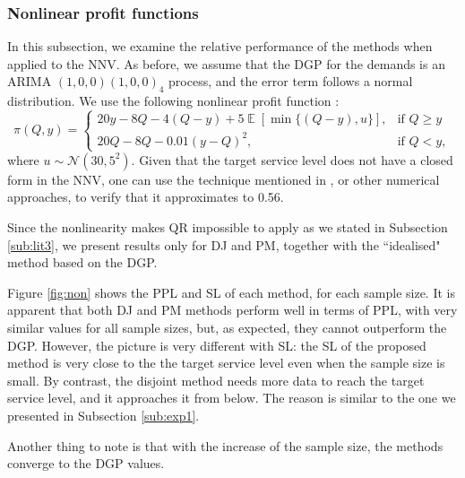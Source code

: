\documentclass{article}
\DeclareMathOperator{\E}{\mathbb{E}}
\begin{document}
\subsubsection{Nonlinear profit functions} \label{sub:exp2}

In this subsection, we examine the relative performance of the methods when applied to the NNV. As before, we assume that the DGP for the demands is an ARIMA $(1,0,0)(1,0,0)_4$ process, and the error term follows a normal distribution. We use the following nonlinear profit function \cite{KK18}:
\[
    \pi(Q,y)=
    \begin{cases}
        20y-8Q-4(Q-y)+5\E[\min \{(Q-y),u\}],& \text{if } Q\geq y\\
        20Q-8Q-0.01(y-Q)^2,& \text{if } Q< y,
    \end{cases}
\]
where $u\sim \mathcal{N}(30,5^2)$. Given that the target service level does not have a closed form in the NNV, one can use the technique mentioned in \cite{KK18}, or other numerical approaches, to verify that it approximates to 0.56.

Since the nonlinearity makes QR impossible to apply as we stated in Subsection \ref{sub:lit3}, we present results only for DJ and PM, together with the ``idealised" method based on the DGP.

Figure \ref{fig:non} shows the PPL and SL of each method, for each sample size. It is apparent that both DJ and PM methods perform well in terms of PPL, with very similar values for all sample sizes, but, as expected, they cannot outperform the DGP. However, the picture is very different with SL: the SL of the proposed method is very close to the the target service level even when the sample size is small. By contrast, the disjoint method needs more data to reach the target service level, and it approaches it from below. The reason is similar to the one we presented in Subsection \ref{sub:exp1}. 

Another thing to note is that with the increase of the sample size, the methods converge to the DGP values.
\end{document}
